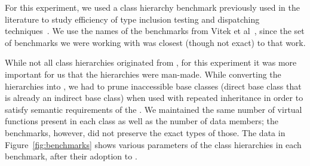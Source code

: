 For this experiment, we used a class hierarchy benchmark previously used in the 
literature to study efficiency of type inclusion testing and dispatching 
techniques~\cite{Vitek97,Krall97nearoptimal,PQEncoding,Ducournau08}.
We use the names of the benchmarks from Vitek et al~\cite[Table 2]{Vitek97}, 
since the set of benchmarks we were working with was closest (though not exact) 
to that work.

While not all class hierarchies originated from \Cpp{}, for this experiment it 
was more important for us that the hierarchies were man-made. While converting 
the hierarchies into \Cpp{}, we had to prune inaccessible base classes (direct base  
class that is already an indirect base class) when used with repeated 
inheritance in order to satisfy semantic requirements of the \Cpp{}. We maintained 
the same number of virtual functions present in each class as well as the number 
of data members; the benchmarks, however, did not preserve the exact types of those.
The data in Figure~\ref{fig:benchmarks} shows various parameters of the class 
hierarchies in each benchmark, after their adoption to \Cpp{}. 

